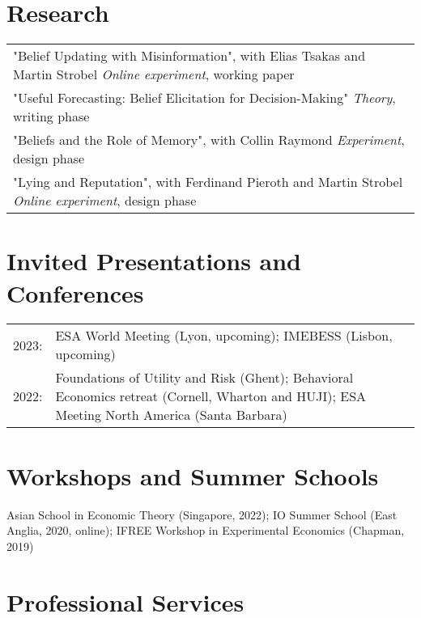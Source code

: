 \documentclass[11pt]{article}
\begin{document}
\section{Research}
\noindent\begin{tabular}{L{17cm}}
	"Belief Updating with Misinformation", with Elias Tsakas and Martin Strobel \newline  \textit{Online experiment}, working paper \\
	\rule{0pt}{4ex}"Useful Forecasting: Belief Elicitation for Decision-Making" \newline  \textit{Theory}, writing phase \\
	\rule{0pt}{4ex}"Beliefs and the Role of Memory", with Collin Raymond \newline  \textit{Experiment}, design phase \\
	\rule{0pt}{4ex}"Lying and Reputation", with Ferdinand Pieroth and Martin Strobel \newline  \textit{Online experiment}, design phase \\
\end{tabular}


\section{Invited Presentations and Conferences}

\noindent\begin{tabular}{L{1cm}L{15cm}}
	  2023: & ESA World Meeting (Lyon, upcoming); IMEBESS (Lisbon, upcoming) \\
    \rule{0pt}{4ex}2022: & Foundations of Utility and Risk (Ghent); Behavioral Economics retreat (Cornell, Wharton and HUJI); ESA Meeting North America (Santa Barbara) 
 
\end{tabular}


\section{Workshops and Summer Schools}

\noindent Asian School in Economic Theory (Singapore, 2022); IO Summer School (East Anglia, 2020, online); IFREE Workshop in Experimental Economics (Chapman, 2019)


\section{Professional Services}
 
\end{document}
